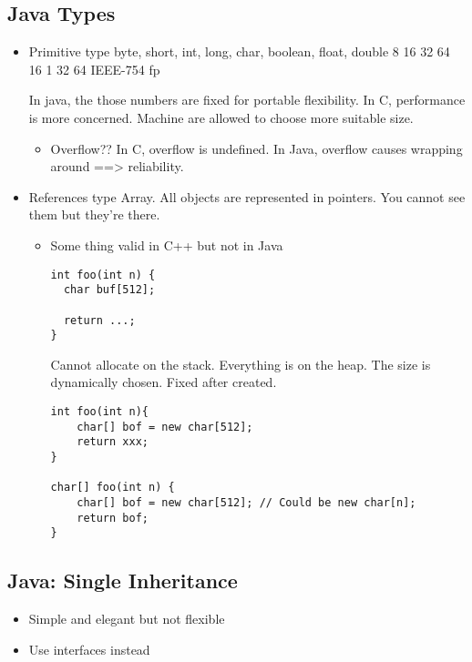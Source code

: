 \documentclass[11pt]{article}
\begin{document}
\subsection{Java Types}
\label{sec:org3bda141}
\begin{itemize}
\item Primitive type
byte, short, int, long, char, boolean, float, double
 8      16    32    64   16      1       32     64
				      IEEE-754 fp

In java, the those numbers are fixed for portable flexibility.
In C, performance is more concerned. Machine are allowed to choose more
suitable size.

\begin{itemize}
\item Overflow??
In C, overflow is undefined.
In Java, overflow causes wrapping around ==> reliability.
\end{itemize}

\item References type
Array.
All objects are represented in pointers. You cannot see them but they're
there.

\begin{itemize}
\item Some thing valid in C++ but not in Java
\begin{verbatim}
int foo(int n) {
  char buf[512];

  return ...;
}
\end{verbatim}

Cannot allocate on the stack. Everything is on the heap.
The size is dynamically chosen.
Fixed after created.
\begin{verbatim}
int foo(int n){
    char[] bof = new char[512];
    return xxx;
}

char[] foo(int n) {
    char[] bof = new char[512]; // Could be new char[n];
    return bof;
}
\end{verbatim}
\end{itemize}
\end{itemize}

\subsection{Java: Single Inheritance}
\label{sec:org0012460}
\begin{itemize}
\item Simple and elegant but not flexible
\item Use interfaces instead
\end{itemize}
\end{document}
